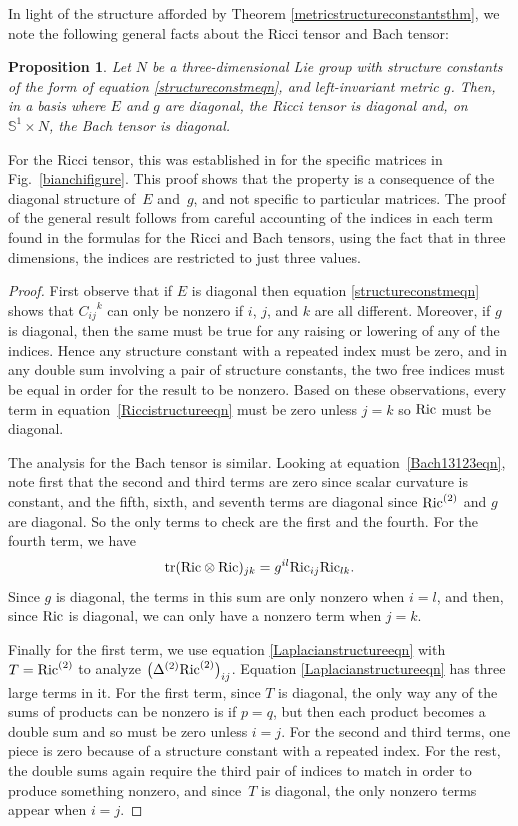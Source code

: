 \documentclass[10pt,a4paper]{amsart}
\numberwithin{equation}{section}
\newtheorem{Proposition}[Theorem]{Proposition}
 { \theoremstyle{definition}
\newtheorem{Definition}[Theorem]{Definition}
\newtheorem{Example}[Theorem]{Example}
\newtheorem{Remark}[Theorem]{Remark} }
\newcommand{\tr}{\operatorname{tr}} %
\begin{document}
In light of the structure afforded by Theorem \ref{metricstructureconstantsthm}, we note the following general facts about the Ricci tensor and Bach tensor:

\begin{Proposition} \label{RicBachdiagprop}
Let $N$ be a three-dimensional Lie group with structure constants of the form of equation \eqref{structureconstmeqn}, and left-invariant metric $g$. Then, in a basis where $E$ and $g$ are diagonal, the Ricci tensor is diagonal and, on $\mathbb{S}^1 \times N$, the Bach tensor is diagonal.
\end{Proposition}

For the Ricci tensor, this was established in \cite{IJ} for the specific matrices in Fig.~\ref{bianchifigure}. This proof shows that the property is a consequence of the diagonal structure of~$E$ and~$g$, and not specific to particular matrices. The proof of the general result follows from careful accounting of the indices in each term found in the formulas for the Ricci and Bach tensors, using the fact that in three dimensions, the indices are restricted to just three values.

\begin{proof}First observe that if $E$ is diagonal then equation \eqref{structureconstmeqn} shows that ${C_{ij}}^k$ can only be nonzero if $i$, $j$, and $k$ are all different. Moreover, if $g$ is diagonal, then the same must be true for any raising or lowering of any of the indices. Hence any structure constant with a repeated index must be zero, and in any double sum involving a pair of structure constants, the two free indices must be equal in order for the result to be nonzero. Based on these observations, every term in equation~\eqref{Riccistructureeqn} must be zero unless $j = k$ so ${\rm Ric}$ must be diagonal.

The analysis for the Bach tensor is similar. Looking at equation~\eqref{Bach13123eqn}, note first that the second and third terms are zero since scalar curvature is constant, and the fifth, sixth, and seventh terms are diagonal since ${\rm Ric}^{(2)}$ and $g$ are diagonal. So the only terms to check are the first and the fourth. For the fourth term, we have
\[
\tr({\rm Ric} \otimes {\rm Ric})_{jk} = g^{il} {\rm Ric}_{ij} {\rm Ric}_{lk}.
\]
Since $g$ is diagonal, the terms in this sum are only nonzero when $i = l$, and then, since ${\rm Ric}$ is diagonal, we can only have a nonzero term when $j = k$.

Finally for the first term, we use equation \eqref{Laplacianstructureeqn} with $T = {\rm Ric}^{(2)}$ to analyze $\big(\Delta^{(2)} {\rm Ric}^{(2)}\big)_{ij}$. Equation \eqref{Laplacianstructureeqn} has three large terms in it. For the first term, since $T$ is diagonal, the only way any of the sums of products can be nonzero is if $p = q$, but then each product becomes a double sum and so must be zero unless $i = j$. For the second and third terms, one piece is zero because of a structure constant with a repeated index. For the rest, the double sums again require the third pair of indices to match in order to produce something nonzero, and since~$T$ is diagonal, the only nonzero terms appear when $i = j$.
\end{proof}
\end{document}
